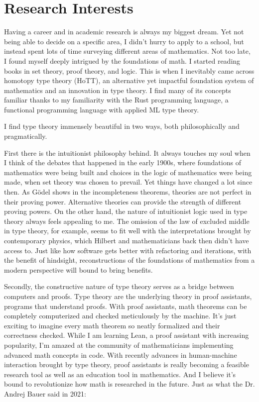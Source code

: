 \section*{Research Interests}

Having a career and in academic research is always my biggest dream.
Yet not being able to decide on a specific area,
I didn't hurry to apply to a school,
but instead spent lots of time surveying different areas of mathematics.
Not too late, I found myself deeply intrigued by the foundations of math.
I started reading books in set theory, proof theory, and logic.
This is when I inevitably came across homotopy type theory (HoTT),
an alternative yet impactful foundation system of mathematics
and an innovation in type theory.
I find many of its concepts familiar thanks to my familiarity
with the Rust programming language,
a functional programming language with applied ML type theory.

I find type theory immensely beautiful in two ways,
both philosophically and pragmatically.

First there is the intuitionist philosophy behind.
It always touches my soul when I think of the debates that
happened in the early 1900s,
where foundations of mathematics were being built
and choices in the logic of mathematics were being made,
when set theory was chosen to prevail.
Yet things have changed a lot since then.
As Gödel shows in the incompleteness theorems,
theories are not perfect in their proving power.
Alternative theories can provide the strength of different proving powers.
On the other hand, the nature of intuitionist logic used in type theory always feels appealing to me.
The omission of the law of excluded middle in type theory, for example,
seems to fit well with the interpretations brought by contemporary physics,
which Hilbert and mathematicians back then didn't have access to.
Just like how software gets better with refactoring and iterations,
with the benefit of hindsight,
reconstructions of the foundations of mathematics from a modern perspective
will bound to bring benefits.

Secondly, the constructive nature of type theory serves as a bridge
between computers and proofs.
Type theory are the underlying theory in proof assistants, programs that understand proofs.
With proof assistants,
math theorems can be completely computerized and checked meticulously by the machine.
It's just exciting to imagine every math theorem so neatly formalized and their correctness checked.
While I am learning Lean,
a proof assistant with increasing popularity,
I'm amazed at the community of mathematicians implementing advanced math concepts in code.
With recently advances in human-machine interaction brought by type theory,
proof assistants is really becoming a feasible research tool as well as an education tool in mathematics.
And I believe it's bound to revolutionize how math is researched in the future.
Just as what the Dr. Andrej Bauer said in 2021:

